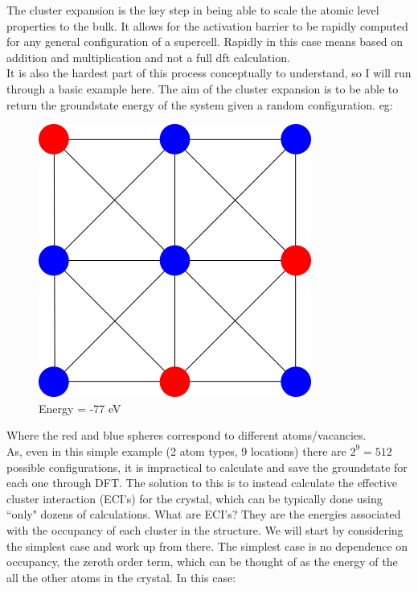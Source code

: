 \documentclass[12pt]{article}
\begin{document}
The cluster expansion is the key step in being able to scale the atomic level properties to the bulk.  It allows for the activation barrier to be rapidly computed for any general configuration of a supercell.  Rapidly in this case means based on addition and multiplication and not a full dft calculation.  \\

It is also the hardest part of this process conceptually to understand, so I will run through a basic example here. The aim of the cluster expansion is to be able to return the groundstate energy of the system given a random configuration.  eg:\\
\begin{figure}[H]
	\centering
\includegraphics[scale=0.5]{./images/config.png}
\caption*{Energy = -77 eV}
\end{figure}

Where the red and blue spheres correspond to different atoms/vacancies.  \\

As, even in this simple example (2 atom types, 9 locations) there are $2^9 = 512$ possible configurations, it is impractical to calculate and save the groundstate for each one through DFT.   The solution to this is to instead calculate the effective cluster interaction (ECI's) for the crystal, which can be typically done using ``only" dozens of calculations.   What are ECI's?  They are the energies associated with the occupancy of each cluster in the structure. 
We will start by considering the simplest case and work up from there.  The simplest case is no dependence on occupancy, the zeroth order term, which can be thought of as the energy of the all the other atoms in the crystal.  In this case: 
\end{document}
